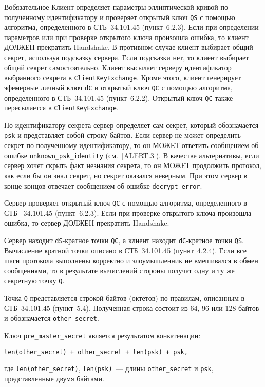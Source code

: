 \begin{appendix}{В}{обязательное}
Клиент определяет параметры эллиптической кривой по полученному 
идентификатору и проверяет открытый ключ \lstinline{QS} с помощью алгоритма, 
определенного в СТБ~34.101.45 (пункт~6.2.3). Если при определении параметров 
или при проверке открытого ключа произошла ошибка, то клиент ДОЛЖЕН 
прекратить Handshake. В противном случае клиент выбирает общий секрет, 
используя подсказку сервера. Если подсказки нет, то клиент выбирает общий 
секрет самостоятельно. Клиент высылает серверу идентификатор выбранного 
секрета  в \lstinline{ClientKeyExchange}. Кроме этого, клиент генерирует 
эфемерные личный ключ \lstinline{dC} и открытый ключ \lstinline{QC} 
с помощью алгоритма, определенного в СТБ~34.101.45 (пункт~6.2.2). 
Открытый ключ \lstinline{QC} также пересылается в 
\lstinline{ClientKeyExchange}.  

По идентификатору секрета сервер определяет сам секрет, который 
обозначается \lstinline{psk} и представляет собой строку байтов. Если сервер не может 
определить секрет по полученному идентификатору, то он МОЖЕТ ответить 
сообщением об ошибке \lstinline{unknown_psk_identity} (см.~\ref{ALERT.3}). В качестве 
альтернативы, если сервер хочет скрыть факт незнания секрета, то он МОЖЕТ 
продолжить протокол, как если бы он знал секрет, но секрет оказался 
неверным. При этом сервер в конце концов отвечает сообщением об ошибке 
\lstinline{decrypt_error}. 

Сервер проверяет открытый ключ \lstinline{QC} с помощью алгоритма, определенного в СТБ~
34.101.45 (пункт~6.2.3). Если при проверке открытого ключа произошла ошибка, 
то сервер ДОЛЖЕН прекратить Handshake. 

Сервер находит \lstinline{dS}-кратное точки \lstinline{QC}, а клиент 
находит \lstinline{dC}-кратное точки \lstinline{QS}.  
Вычисление кратной точки описано в СТБ~34.101.45 (пункт~4.2.4). Если все 
шаги протокола выполнены корректно и злоумышленник не вмешивался в обмен 
сообщениями, то в результате вычислений стороны получат одну и ту же 
секретную точку \lstinline{Q}.  

Точка \lstinline{Q} представляется строкой байтов (октетов) по правилам, описанным в 
СТБ~34.101.45 (пункт~5.4). Полученная строка состоит из 64, 96 или 128 байтов 
и обозначается \lstinline{other_secret}. 

Ключ \lstinline{pre_master_secret} является результатом конкатенации:
\begin{lstlisting}
len(other_secret) + other_secret + len(psk) + psk,
\end{lstlisting}
где \lstinline{len(other_secret)}, \lstinline{len(psk)}~--- длины 
\lstinline{other_secret} и \lstinline{psk}, представленные двумя байтами. 


\end{appendix}
